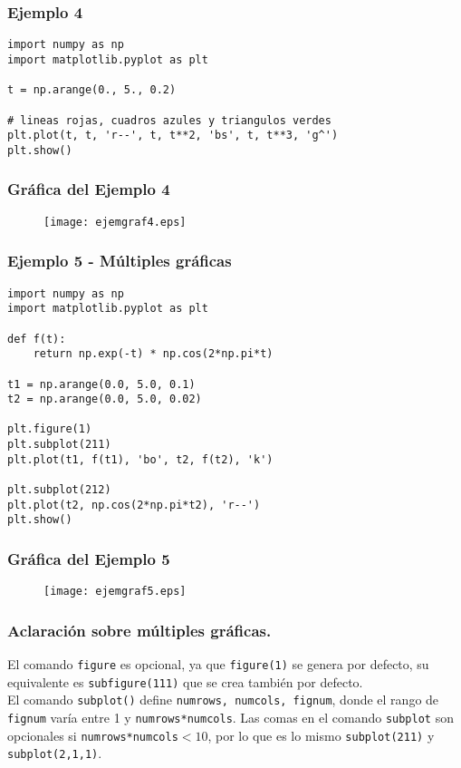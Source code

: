 \documentclass[12pt]{beamer}
\begin{document}
\begin{frame}[fragile]
\frametitle{Ejemplo 4}
\begin{lstlisting}
import numpy as np
import matplotlib.pyplot as plt

t = np.arange(0., 5., 0.2)

# lineas rojas, cuadros azules y triangulos verdes
plt.plot(t, t, 'r--', t, t**2, 'bs', t, t**3, 'g^')
plt.show()
\end{lstlisting}
\end{frame}
\begin{frame}[fragile]
\frametitle{Gr\'{a}fica del Ejemplo 4}
\begin{figure}
	\centering	
	\texttt{[image: ejemgraf4.eps]} 
\end{figure}
\end{frame}
\begin{frame}[fragile]
\frametitle{Ejemplo 5 - M\'{u}ltiples gr\'{a}ficas}
\begin{lstlisting}
import numpy as np
import matplotlib.pyplot as plt

def f(t):
    return np.exp(-t) * np.cos(2*np.pi*t)

t1 = np.arange(0.0, 5.0, 0.1)
t2 = np.arange(0.0, 5.0, 0.02)

plt.figure(1)
plt.subplot(211)
plt.plot(t1, f(t1), 'bo', t2, f(t2), 'k')

plt.subplot(212)
plt.plot(t2, np.cos(2*np.pi*t2), 'r--')
plt.show()
\end{lstlisting}
\end{frame}
\begin{frame}[fragile]
\frametitle{Gr\'{a}fica del Ejemplo 5}
\begin{figure}
	\centering	
	\texttt{[image: ejemgraf5.eps]} 
\end{figure}
\end{frame}
\begin{frame}
\frametitle{Aclaraci\'{o}n sobre m\'{u}ltiples gr\'{a}ficas.}
El comando \texttt{figure} es opcional, ya que \texttt{figure(1)} se genera por defecto, su equivalente es \texttt{subfigure(111)} que se crea tambi\'{e}n por defecto.
\\
\bigskip
El comando \texttt{subplot()} define \texttt{numrows, numcols, fignum}, donde el rango de  \texttt{fignum} var\'{i}a entre 1 y \texttt{numrows*numcols}. Las comas en el comando \texttt{subplot} son opcionales si \texttt{numrows*numcols}$<10$, por lo que es lo mismo \texttt{subplot(211)} y \texttt{subplot(2,1,1)}.
\end{frame}
\end{document}
